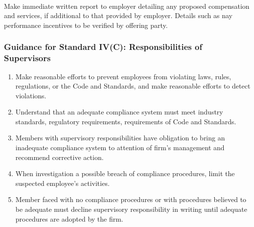 \begin{remark} \\
Make immediate written report to employer detailing any proposed compensation and services, if additional to that provided by employer. Details such as nay performance incentives to be verified by offering party.
\end{remark}

\subsubsection{Guidance for Standard IV(C): Responsibilities of Supervisors}

\begin{remark} 
\begin{enumerate}[label=\roman*.]
\setlength{\itemsep}{0pt}
\item Make reasonable efforts to prevent employees from violating laws, rules, regulations, or the Code and Standards, and make reasonable efforts to detect violations.
\item Understand that an adequate compliance system must meet industry standards, regulatory requirements, requirements of Code and Standards.
\item Members with supervisory responsibilities have obligation to bring an inadequate compliance system to attention of firm's management and recommend corrective action.
\item When investigation a possible breach of compliance procedures, limit the suspected employee's activities.
\item Member faced with no compliance procedures or with procedures believed to be adequate must decline supervisory responsibility in writing until adequate procedures are adopted by the firm.
\end{enumerate}
\end{remark}

